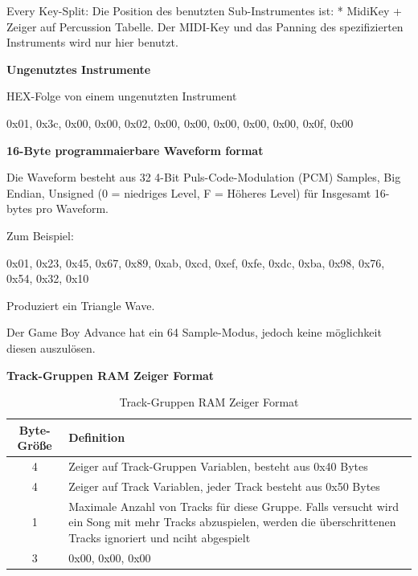 \documentclass[11pt,a4paper]{scrartcl}
\begin{document}
Every Key-Split:\newline
Die Position des benutzten Sub-Instrumentes ist: * MidiKey + Zeiger auf Percussion Tabelle.\newline
Der MIDI-Key und das Panning des spezifizierten Instruments wird nur hier benutzt.

\vspace{15pt}
\textbf{{\large Ungenutztes Instrumente}}

HEX-Folge von einem ungenutzten Instrument

0x01, 0x3c, 0x00, 0x00, 0x02, 0x00, 0x00, 0x00, 0x00, 0x00, 0x0f, 0x00
		
\vspace{15pt}
\textbf{{\large 16-Byte programmaierbare Waveform format}}

Die Waveform besteht aus 32 4-Bit Puls-Code-Modulation (PCM) Samples, Big Endian, Unsigned (0 = niedriges Level, F = H\"{o}heres Level) f\"{u}r Insgesamt 16-bytes pro Waveform.

Zum Beispiel:

0x01, 0x23, 0x45, 0x67, 0x89, 0xab, 0xcd, 0xef, 0xfe, 0xdc, 0xba, 0x98, 0x76, 0x54, 0x32, 0x10

Produziert ein Triangle Wave.

Der Game Boy Advance hat ein 64 Sample-Modus, jedoch keine m\"{o}glichkeit diesen auszul\"{o}sen.

\newpage
\textbf{{\large Track-Gruppen RAM Zeiger Format}}

\begin{table}[h]
    \centering
    \begin{tabular}{ c | p{15cm} }
        \textbf{Byte-Gr\"{o}{\ss}e} & \textbf{Definition}\\
        \hline
        4 & Zeiger auf Track-Gruppen Variablen, besteht aus 0x40 Bytes\\
				\hline
        4 & Zeiger auf Track Variablen, jeder Track besteht aus 0x50 Bytes\\
				\hline
        1 & Maximale Anzahl von Tracks f\"{u}r diese Gruppe. Falls versucht wird ein Song mit mehr Tracks abzuspielen, werden die \"{u}berschrittenen Tracks ignoriert und nciht abgespielt\\
				\hline
        3 & 0x00, 0x00, 0x00\\
    \end{tabular}
    \caption{Track-Gruppen RAM Zeiger Format}
    \label{table:RAMZeiger}
\end{table}
\end{document}
